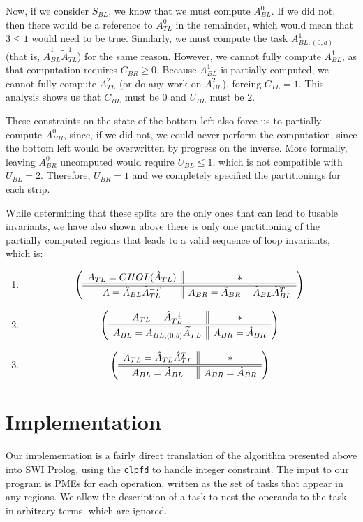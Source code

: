 \documentclass[12pt,letterpaper]{article}
\begin{document}
Now, if we consider $S_{BL}$, we know that we must compute $A_{BL}^0$.
If we did not, then there would be a reference to $A_{TL}^0$ in the remainder, which would mean that $3 \leq 1$ would need to be true.
Similarly, we must compute the task $A_{BL, (0, a)}^1$ (that is, $\hat{A}_{BL}^1\widetilde{A}_{TL}^1$) for the same reason.
However, we cannot fully compute $A^1_{BL}$, as that computation requires $C_{BR} \geq 0$.
Because $A^1_{BL}$ is partially computed, we cannot fully compute $A_{TL}^2$ (or do any work on $A_{BL}^2$), forcing $C_{TL} = 1$.
This analysis shows us that $C_{BL}$ must be $0$ and $U_{BL}$ must be $2$.

These constraints on the state of the bottom left also force us to partially compute $A_{BR}^0$, since, if we did not, we could never perform the computation, since the bottom left would be overwritten by progress on the inverse.
More formally, leaving $A_{BR}^0$ uncomputed would require $U_{BL} \leq 1$, which is not compatible with $U_{BL} = 2$.
Therefore, $U_{BR} = 1$ and we completely specified the partitionings for each strip.

While determining that these splits are the only ones that can lead to fusable invariants, we have also shown above there is only one partitioning of the partially computed regions that leads to a valid sequence of loop invariants, which is:
\begin{enumerate}
\item
  \begin{equation*}
  \left( \begin{array}{c || c} A_{TL}  = CHOL(\hat{A}_{TL}) & * \\ \hline \hline A = \hat{A}_{BL}\widetilde{A}_{TL}^{-T} & A_{BR} = \hat{A}_{BR} - \widetilde{A}_{BL}\widetilde{A}_{BL}^T \end{array} \right)
  \end{equation*}
\item
  \begin{equation*}
    \left( \begin{array}{c || c} A_{TL} = \hat{A}_{TL}^{-1} & * \\ \hline \hline A_{BL} = A_{BL, (0, b)}\widetilde{A}_{TL} & A_{BR} =  \hat{A}_{BR} \end{array} \right)
  \end{equation*}
\item
  \begin{equation*}
    \left( \begin{array}{c || c} A_{TL} = \hat{A}_{TL}\hat{A}_{TL}^T & * \\ \hline \hline A_{BL} = \hat{A}_{BL} & A_{BR} = \hat{A}_{BR} \end{array} \right)
  \end{equation*}
\end{enumerate}

\section{Implementation}
Our implementation is a fairly direct translation of the algorithm presented above into SWI Prolog, using the \texttt{clpfd} to handle integer constraint.
The input to our program is PMEs for each operation, written as the set of tasks that appear in any regions.
We allow the description of a task to nest the operands to the task in arbitrary terms, which are ignored.
\end{document}
